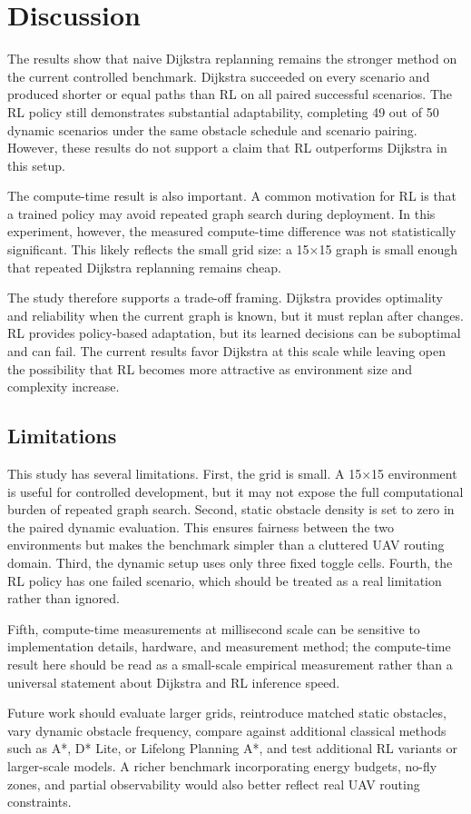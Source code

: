 \section{Discussion}
\label{sec:discussion}

The results show that naive Dijkstra replanning remains the stronger method on the current controlled benchmark. Dijkstra succeeded on every scenario and produced shorter or equal paths than RL on all paired successful scenarios. The RL policy still demonstrates substantial adaptability, completing 49 out of 50 dynamic scenarios under the same obstacle schedule and scenario pairing. However, these results do not support a claim that RL outperforms Dijkstra in this setup.

The compute-time result is also important. A common motivation for RL is that a trained policy may avoid repeated graph search during deployment. In this experiment, however, the measured compute-time difference was not statistically significant. This likely reflects the small grid size: a 15$\times$15 graph is small enough that repeated Dijkstra replanning remains cheap.

The study therefore supports a trade-off framing. Dijkstra provides optimality and reliability when the current graph is known, but it must replan after changes. RL provides policy-based adaptation, but its learned decisions can be suboptimal and can fail. The current results favor Dijkstra at this scale while leaving open the possibility that RL becomes more attractive as environment size and complexity increase.

\subsection{Limitations}

This study has several limitations. First, the grid is small. A 15$\times$15 environment is useful for controlled development, but it may not expose the full computational burden of repeated graph search. Second, static obstacle density is set to zero in the paired dynamic evaluation. This ensures fairness between the two environments but makes the benchmark simpler than a cluttered UAV routing domain. Third, the dynamic setup uses only three fixed toggle cells. Fourth, the RL policy has one failed scenario, which should be treated as a real limitation rather than ignored.

Fifth, compute-time measurements at millisecond scale can be sensitive to implementation details, hardware, and measurement method; the compute-time result here should be read as a small-scale empirical measurement rather than a universal statement about Dijkstra and RL inference speed.

Future work should evaluate larger grids, reintroduce matched static obstacles, vary dynamic obstacle frequency, compare against additional classical methods such as A*, D* Lite, or Lifelong Planning A*, and test additional RL variants or larger-scale models. A richer benchmark incorporating energy budgets, no-fly zones, and partial observability would also better reflect real UAV routing constraints.
